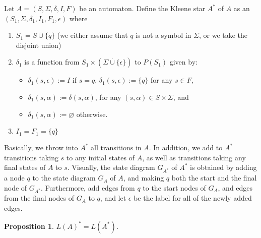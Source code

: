\documentclass[12pt]{article}
\newtheorem{prop}{Proposition}
\begin{document}
Let $A=(S,\Sigma,\delta,I,F)$ be an automaton.  Define the Kleene star $A^*$ of $A$ as an  $(S_1,\Sigma,\delta_1, I_1,F_1,\epsilon)$ where
\begin{enumerate}
\item $S_1=S\stackrel{\cdot}{\cup} \lbrace q\rbrace$ (we either assume that $q$ is not a symbol in $\Sigma$, or we take the disjoint union)
\item $\delta_1$ is a function from $S_1\times (\Sigma\stackrel{\cdot}{\cup} \lbrace \epsilon\rbrace)$ to $P(S_1)$ given by:
\begin{itemize}
\item $\delta_1(s,\epsilon):=I$ if $s=q$, $\delta_1(s,\epsilon):=\lbrace q\rbrace$ for any $s\in F$,
\item $\delta_1(s,\alpha):=\delta(s,\alpha)$, for any $(s,\alpha)\in S\times \Sigma$, and 
\item $\delta_1(s,\alpha):=\varnothing$ otherwise.
\end{itemize}
\item $I_1=F_1=\lbrace q\rbrace$
\end{enumerate}
Basically, we throw into $A^*$ all transitions in $A$.  In addition, we add to $A^*$ transitions taking $s$ to any initial states of $A$, as well as transitions taking any final states of $A$ to $s$.  Visually, the state diagram $G_{A^*}$ of $A^*$ is obtained by adding a node $q$ to the state diagram $G_A$ of $A$, and making $q$ both the start and the final node of $G_{A^*}$.  Furthermore, add edges from $q$ to the start nodes of $G_A$, and edges from the final nodes of $G_A$ to $q$, and let $\epsilon$ be the label for all of the newly added edges.
\begin{prop} $L(A)^*=L(A^*)$. \end{prop}
\end{document}
